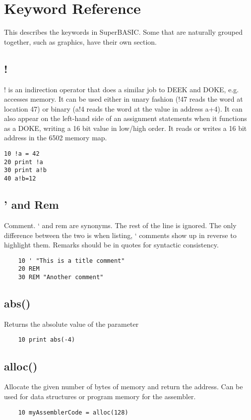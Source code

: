 \chapter{Keyword Reference}

This describes the keywords in SuperBASIC. Some that are naturally grouped together, such as graphics, have their own section.

\section*{!}
! is an indirection operator that does a similar job to DEEK and DOKE, e.g. accesses memory. It can be used either in unary fashion (!47 reads the word at location 47) or binary (a!4 reads the word at the value in address a+4). It can also appear on the left-hand side of an assignment statements when it functions as a DOKE, writing a 16 bit value in low/high order. 
It reads or writes a 16 bit address in the 6502 memory map.
\example{}
\begin{verbatim}
10 !a = 42  
20 print !a   
30 print a!b   
40 a!b=12
\end{verbatim}

\section*{' and Rem}
Comment. ‘ and rem are synonyms.  The rest of the line is ignored. The only difference between the two is when listing, ‘ comments show up in reverse to highlight them. Remarks should be in quotes for syntactic consistency.

\begin{verbatim}
	10 ' "This is a title comment"
	20 REM 
	30 REM "Another comment"
\end{verbatim}

\section*{abs()}
Returns the absolute value of the parameter

\example{}
\begin{verbatim}
	10 print abs(-4)
\end{verbatim}

\section*{alloc()}
Allocate the given number of bytes of memory and return the address. Can be used for data structures or program memory for the assembler.
\example{}
\begin{verbatim}
	10 myAssemblerCode = alloc(128)
\end{verbatim}

